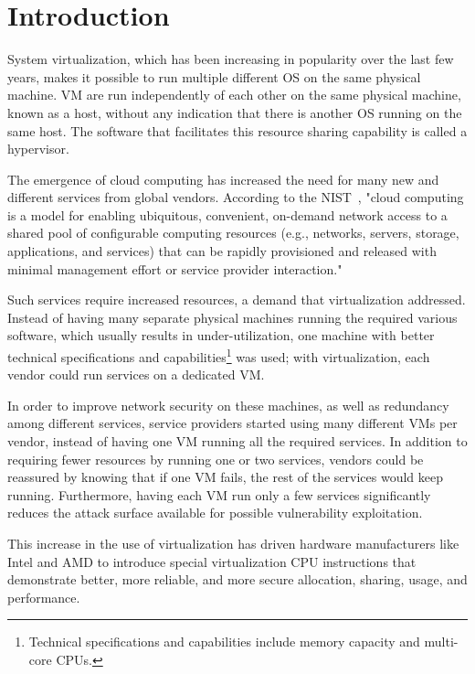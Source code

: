 \chapter{Introduction}\label{ch:intro}

System virtualization, which has been increasing in popularity over the last few years, makes it possible to run multiple different \ac{OS} on the same physical machine. \ac{VM} are run independently of each other on the same physical machine, known as a host, without any indication that there is another \ac{OS} running on the same host. The software that facilitates this resource sharing capability is called a hypervisor.

\par The emergence of cloud computing has increased the need for many new and different services from global vendors. According to the \ac{NIST}~\cite{mell2011nist}, "cloud computing is a model for enabling ubiquitous, convenient, on-demand network access to a shared pool of configurable computing resources (e.g., networks, servers, storage, applications, and services) that can be rapidly provisioned and released with minimal management effort or service provider interaction."

\par Such services require increased resources, a demand that virtualization addressed. Instead of having many separate physical machines running the required various software, which usually results in under-utilization, one machine with better technical specifications and capabilities\footnote{Technical specifications and capabilities include memory capacity and multi-core \acp{CPU}.} was used; with virtualization, each vendor could run services on a dedicated \ac{VM}. 

\par In order to improve network security on these machines, as well as redundancy among different services, service providers started using many different \acp{VM} per vendor, instead of having one \ac{VM} running all the required services. In addition to requiring fewer resources by running one or two services, vendors could be reassured by knowing that if one VM fails, the rest of the services would keep running. Furthermore, having each \ac{VM} run only a few services significantly reduces the attack surface available for possible vulnerability exploitation.

\par This increase in the use of virtualization has driven hardware manufacturers like Intel and AMD to introduce special virtualization \ac{CPU} instructions that demonstrate better, more reliable, and more secure allocation, sharing, usage, and performance.

